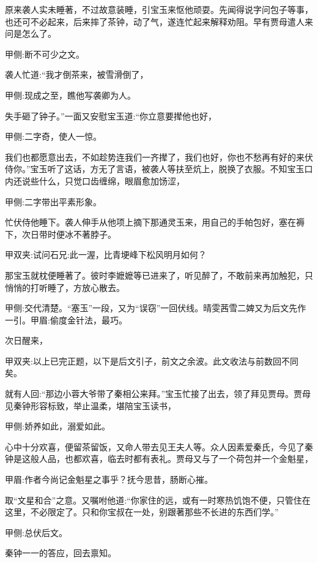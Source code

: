 \begin{parag}
    原来袭人实未睡著，不过故意装睡，引宝玉来怄他顽耍。先闻得说字问包子等事，也还可不必起来，后来摔了茶钟，动了气，遂连忙起来解释劝阻。早有贾母遣人来问是怎么了。\begin{note}甲侧:断不可少之文。\end{note}袭人忙道:“我才倒茶来，被雪滑倒了，\begin{note}甲侧:现成之至，瞧他写袭卿为人。\end{note}失手砸了钟子。”一面又安慰宝玉道:“你立意要撵他也好，\begin{note}甲侧:二字奇，使人一惊。\end{note}我们也都愿意出去，不如趁势连我们一齐撵了，我们也好，你也不愁再有好的来伏侍你。”宝玉听了这话，方无了言语，被袭人等扶至炕上，脱换了衣服。不知宝玉口内还说些什么，只觉口齿缠绵，眼眉愈加饧涩，\begin{note}甲侧:二字带出平素形象。\end{note}忙伏侍他睡下。袭人伸手从他项上摘下那通灵玉来，用自己的手帕包好，塞在褥下，次日带时便冰不著脖子。\begin{note}甲双夹:试问石兄:此一渥，比青埂峰下松风明月如何？\end{note}那宝玉就枕便睡著了。彼时李嬷嬷等已进来了，听见醉了，不敢前来再加触犯，只悄悄的打听睡了，方放心散去。\begin{note}甲侧:交代清楚。“塞玉”一段，又为“误窃”一回伏线。晴雯茜雪二婢又为后文先作一引。甲眉:偷度金针法，最巧。\end{note}
\end{parag}


\begin{parag}
    次日醒来，\begin{note}甲双夹:以上已完正题，以下是后文引子，前文之余波。此文收法与前数回不同矣。\end{note}就有人回:“那边小蓉大爷带了秦相公来拜。”宝玉忙接了出去，领了拜见贾母。贾母见秦钟形容标致，举止温柔，堪陪宝玉读书，\begin{note}甲侧:娇养如此，溺爱如此。\end{note}心中十分欢喜，便留茶留饭，又命人带去见王夫人等。众人因素爱秦氏，今见了秦钟是这般人品，也都欢喜，临去时都有表礼。贾母又与了一个荷包并一个金魁星，\begin{note}甲眉:作者今尚记金魁星之事乎？抚今思昔，肠断心摧。\end{note}取“文星和合”之意。又嘱咐他道:“你家住的远，或有一时寒热饥饱不便，只管住在这里，不必限定了。只和你宝叔在一处，别跟著那些不长进的东西们学。”\begin{note}甲侧:总伏后文。\end{note}秦钟一一的答应，回去禀知。
\end{parag}


